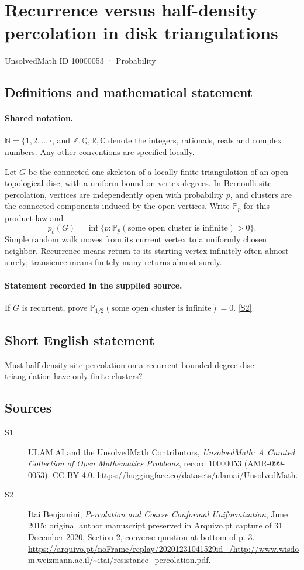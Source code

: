 \documentclass[11pt]{article}
\newcommand{\sref}[2]{\hyperlink{source:#1:#2}{[S#2]}}
\begin{document}
\setcounter{section}{10000052}
\section{Recurrence versus half-density percolation in disk triangulations}\label{10000053}
{\small\sffamily UnsolvedMath ID 10000053 · Probability}
\subsection{Definitions and mathematical statement}

\paragraph{Shared notation.}$\mathbb N=\{1,2,\ldots\}$, and $\mathbb Z,\mathbb Q,\mathbb R,\mathbb C$ denote the integers, rationals, reals and complex numbers. Any other conventions are specified locally.


Let $G$ be the connected one-skeleton of a locally finite triangulation of an open topological disc, with a uniform bound on vertex degrees. In Bernoulli site percolation, vertices are independently open with probability $p$, and clusters are the connected components induced by the open vertices. Write $\mathbb P_p$ for this product law and
\[p_c(G)=\inf\{p:\mathbb P_p(\text{some open cluster is infinite})>0\}.\]
Simple random walk moves from its current vertex to a uniformly chosen neighbor. Recurrence means return to its starting vertex infinitely often almost surely; transience means finitely many returns almost surely.
\paragraph{Statement recorded in the supplied source.}
If $G$ is recurrent, prove $\mathbb P_{1/2}(\text{some open cluster is infinite})=0$. \sref{10000053}{2}
\subsection{Short English statement}
Must half-density site percolation on a recurrent bounded-degree disc triangulation have only finite clusters?
\subsection{Sources}
\begin{description}
\item[\hypertarget{source:10000053:1}{S1}] ULAM.AI and the UnsolvedMath Contributors, \emph{UnsolvedMath: A Curated Collection of Open Mathematics Problems}, record 10000053 (AMR-099-0053). CC BY 4.0. \url{https://huggingface.co/datasets/ulamai/UnsolvedMath}.
\item[\hypertarget{source:10000053:2}{S2}] Itai Benjamini, \emph{Percolation and Coarse Conformal Uniformization}, June 2015; original author manuscript preserved in Arquivo.pt capture of 31 December 2020, Section 2, converse question at bottom of p. 3. \url{https://arquivo.pt/noFrame/replay/20201231041529id_/http://www.wisdom.weizmann.ac.il/~itai/resistance_percolation.pdf}.
\end{description}
\label{end:10000053}
\end{document}
